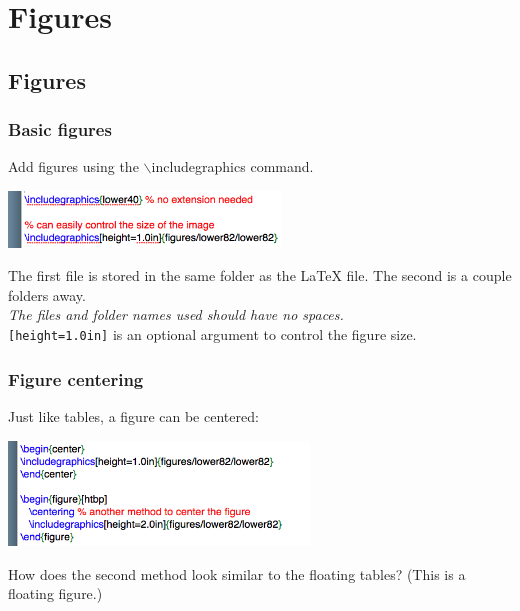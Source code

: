\documentclass[slidestop,compress,mathserif]{beamer}
\begin{document}
\section[Figures]{Figures}
\subsection[Figures]{Figures}
\begin{frame} \frametitle{Basic figures}
Add figures using the {\color{command}$\backslash$includegraphics} command.
\begin{center}
\includegraphics[height=15mm]{basicsOfLatex/figures/basicFigures}
\end{center}
The first file is stored in the same folder as the LaTeX file. The second is a couple folders away.
\vspace{0.5cm} \\
\emph{The files and folder names used should have no spaces.}
\vspace{0.5cm} \\
\texttt{[height=1.0in]} is an optional argument to control the figure size.
\end{frame}

\begin{frame} \frametitle{Figure centering}
Just like tables, a figure can be centered:
\begin{center}
\includegraphics[height=1.1in]{basicsOfLatex/figures/centerFigure}
\end{center}
How does the second method look similar to the floating tables? (This is a floating figure.)
\end{frame}
\end{document}
